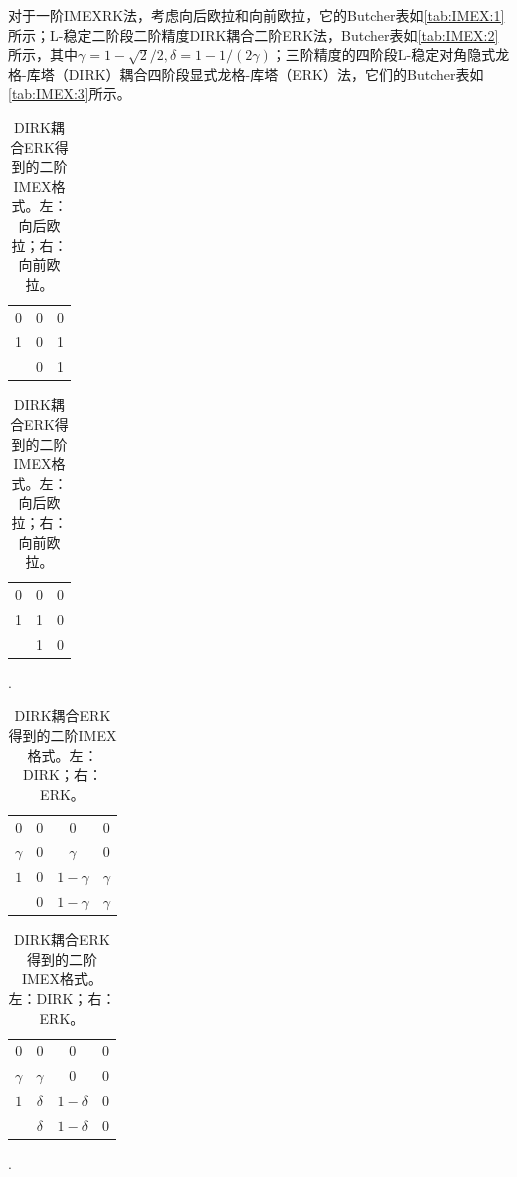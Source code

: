 对于一阶IMEXRK法，考虑向后欧拉和向前欧拉\cite{ascher1997implicitexplicita}，它的Butcher表如\autoref{tab:IMEX:1}所示；L-稳定二阶段二阶精度DIRK耦合二阶ERK法\cite{ascher1997implicitexplicita}，Butcher表如\autoref{tab:IMEX:2}所示，其中$\gamma=1- \sqrt{2}/2,\delta = 1- 1/(2\gamma)$；三阶精度的四阶段L-稳定对角隐式龙格-库塔（DIRK）耦合四阶段显式龙格-库塔（ERK）法\cite{ascher1997implicitexplicita}，它们的Butcher表如\autoref{tab:IMEX:3}所示。
\begin{table}
    \centering
    \begin{minipage}{0.45\linewidth}
        \centering
        \begin{tabular}{c|cc}
            0 & 0 & 0 \\
            1 & 0 & 1 \\
            \hline
              & 0 & 1
        \end{tabular}
    \end{minipage}
    \begin{minipage}{0.45\linewidth}
        \centering
        \begin{tabular}{c|cc}
            0 & 0 & 0 \\
            1 & 1 & 0 \\
            \hline
              & 1 & 0
        \end{tabular}.
    \end{minipage}
    \caption{DIRK耦合ERK得到的二阶IMEX格式。左：向后欧拉；右：向前欧拉。}
    \label{tab:IMEX:1}
\end{table}
\begin{table}
    \centering
    \begin{minipage}{0.45\linewidth}
        \centering
        \begin{tabular}{c|ccc}
            0        & 0 & 0          & 0        \\
            $\gamma$ & 0 & $\gamma$   & $0$      \\
            $1$      & 0 & $1-\gamma$ & $\gamma$ \\
            \hline
                     & 0 & $1-\gamma$ & $\gamma$
        \end{tabular}
    \end{minipage}
    \begin{minipage}{0.45\linewidth}
        \centering
        \begin{tabular}{c|ccc}
            0        & 0        & 0           & 0 \\
            $\gamma$ & $\gamma$ & $0$         & 0 \\
            $1$      & $\delta$ & $1- \delta$ & 0 \\
            \hline
                     & $\delta$ & $1-\delta$  & 0
        \end{tabular}.
    \end{minipage}
    \caption{DIRK耦合ERK得到的二阶IMEX格式。左：DIRK；右：ERK。}
    \label{tab:IMEX:2}
\end{table}



